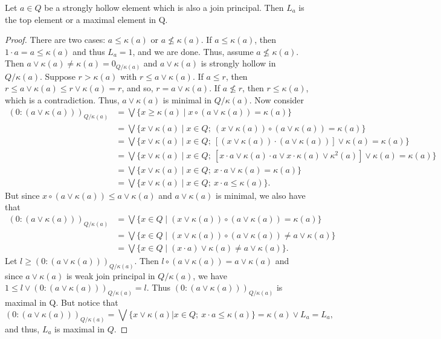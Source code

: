 \documentclass[10pt,a4paper]{amsart}
\def\leq{\leqslant}
\begin{document}
	\begin{theorem}
		Let $a\in Q$ be a strongly hollow element which is also a join principal. Then $L_a$ is the top element or a maximal element in Q.
	\end{theorem}

	\begin{proof}
		There are two cases: $a\leq \kappa(a)$ or $a\nleq\kappa(a)$. If $a\leq\kappa(a)$, then \(1\cdot a=a\leq\kappa(a)\) and thus $L_a=1$, and we are done. Thus, assume $a\nleq \kappa(a)$. Then $a\vee\kappa(a)\neq\kappa(a)=0_{Q/\kappa(a)}$ and $a\vee\kappa(a)$ is strongly hollow in $Q/\kappa(a)$. Suppose $r>\kappa(a)$ with $r\leq a\vee\kappa(a)$. If $a\leq r$, then $r\leq a\vee\kappa(a)\leq r\vee\kappa(a)=r$, and so, $r=a\vee\kappa(a)$. If $a\nleq r$, then $r\leq\kappa(a)$, which is a contradiction. Thus, $a\vee\kappa(a)$ is minimal in $Q/\kappa(a)$. Now consider  
		\begin{align*}
			(0:(a\vee\kappa(a)))_{Q/\kappa(a)}&=\bigvee\{x\geqslant\kappa(a)\mid  x\circ(a\vee\kappa(a))=\kappa(a)\} \\
			&=\bigvee\{x\vee\kappa(a)\mid x\in Q;\: (x\vee\kappa(a))\circ(a\vee\kappa(a))=\kappa(a)\} \\
			&=\bigvee\{x\vee\kappa(a)\mid x\in Q;\: [(x\vee\kappa(a))\cdot(a\vee\kappa(a))]\vee\kappa(a)=\kappa(a)\} \\
			&=\bigvee\{x\vee\kappa(a)\mid x\in Q;\: [x\cdot a\vee\kappa(a)\cdot a\vee x\cdot\kappa(a)\vee\kappa^2(a)]\vee\kappa(a)=\kappa(a)\} \\
			&=\bigvee\{x\vee\kappa(a)\mid x\in Q;\: x\cdot a\vee\kappa(a)=\kappa(a)\}\\
			&=\bigvee\{x\vee\kappa(a)\mid x\in Q;\: x\cdot a\leq\kappa(a)\}.   
		\end{align*}
		But since $x\circ( a\vee\kappa(a))\leq a\vee\kappa(a)$ and $a\vee\kappa(a)$ is minimal, we also have that
		\begin{align*}
			(0:(a\vee\kappa(a)))_{Q/\kappa(a)}&=\bigvee\{x\in Q\mid  (x\vee\kappa(a))\circ(a\vee\kappa(a))=\kappa(a)\}\\&=\bigvee\{x\in Q\mid  (x\vee\kappa(a))\circ(a\vee\kappa(a))\neq a\vee\kappa(a)\}\\
			&=\bigvee\{x\in Q\mid  (x\cdot a)\vee \kappa(a)\neq a\vee\kappa(a)\}.
		\end{align*}
		Let $l\geqslant (0:(a\vee\kappa(a)))_{Q/\kappa(a)}$. Then $l\circ (a\vee\kappa(a))=a\vee\kappa(a)$ and since $a\vee\kappa(a)$ is weak join principal in $Q/\kappa(a)$, we have $1\leq l\vee (0:(a\vee\kappa(a)))_{Q/\kappa(a)}=l$. Thus $(0:(a\vee\kappa(a)))_{Q/\kappa(a)}$ is maximal in Q. But notice that \[(0:(a\vee\kappa(a)))_{Q/\kappa(a)}=\bigvee\{x\vee\kappa(a)|x\in Q;\: x\cdot a\leq\kappa(a)\}=\kappa(a)\vee L_a=L_a,\] and thus, $L_a$ is maximal in $Q$.
	\end{proof}
\end{document}
